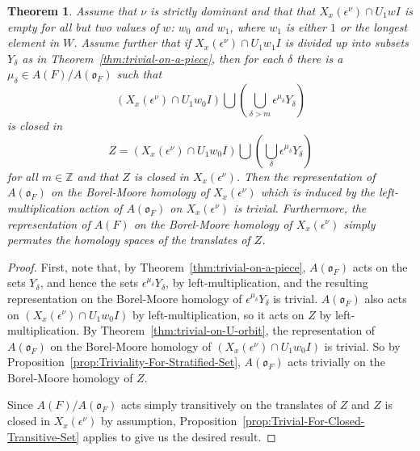 \documentclass{amsart}
\newtheorem{theorem}{Theorem}
\theoremstyle{definition}
\def\O{\mathfrak{o}}
\def\e{\epsilon}
\def\A{A(\O_F)}
\def\en{\e^{\nu}}
\def\X{X_x(\en)}
\def\Z{\mathbb{Z}}
\begin{document}
  \begin{theorem}
    \label{thm:Triviality-For-Nice-Stratification}
    Assume that $\nu$ is strictly dominant and that that $\X \cap U_1 wI$ is
    empty for all but two values of $w$: $w_0$ and $w_1$, where $w_1$ is either
    $1$ or the longest element in $W$.  Assume further that if $\X \cap U_1
    w_1I$ is divided up into subsets $Y_\delta$ as in
    Theorem~\ref{thm:trivial-on-a-piece}, then for each $\delta$ there is a
    $\mu_\delta \in A(F)/\A$ such that
    \begin{equation*}
      (\X \cap U_1 w_0 I) \bigcup \left(\bigcup_{\delta > m} \e^{\mu_\delta} Y_\delta\right)
    \end{equation*}
    is closed in
    \begin{equation*}
      Z = (\X \cap U_1 w_0 I) \bigcup \left(\bigcup_{\delta} \e^{\mu_\delta}
      Y_\delta\right)
    \end{equation*}
    for all $m \in \Z$ and that $Z$ is closed in $\X$.  Then the representation
    of $\A$ on the Borel-Moore homology of $\X$ which is induced by the
    left-multiplication action of $\A$ on $\X$ is trivial.  Furthermore, the
    representation of $A(F)$ on the Borel-Moore homology of $\X$ simply
    permutes the homology spaces of the translates of $Z$.
  \end{theorem}
  \begin{proof}
    First, note that, by Theorem~\ref{thm:trivial-on-a-piece}, $\A$ acts on the
    sets $Y_\delta$, and hence the sets $\e^{\mu_\delta}Y_\delta$, by
    left-multiplication, and the resulting representation on the Borel-Moore
    homology of $\e^{\mu_\delta}Y_\delta$ is trivial.  $\A$ also acts on $(\X
    \cap U_1 w_0 I)$ by left-multiplication, so it acts on $Z$ by
    left-multiplication.  By Theorem~\ref{thm:trivial-on-U-orbit}, the
    representation of $\A$ on the Borel-Moore homology of $(\X \cap U_1 w_0 I)$
    is trivial.  So by Proposition~\ref{prop:Triviality-For-Stratified-Set},
    $\A$ acts trivially on the Borel-Moore homology of $Z$.
    
    Since $A(F)/\A$ acts simply transitively on the translates of $Z$ and $Z$
    is closed in $\X$ by assumption,
    Proposition~\ref{prop:Trivial-For-Closed-Transitive-Set} applies to give us
    the desired result.
  \end{proof}
\end{document}
